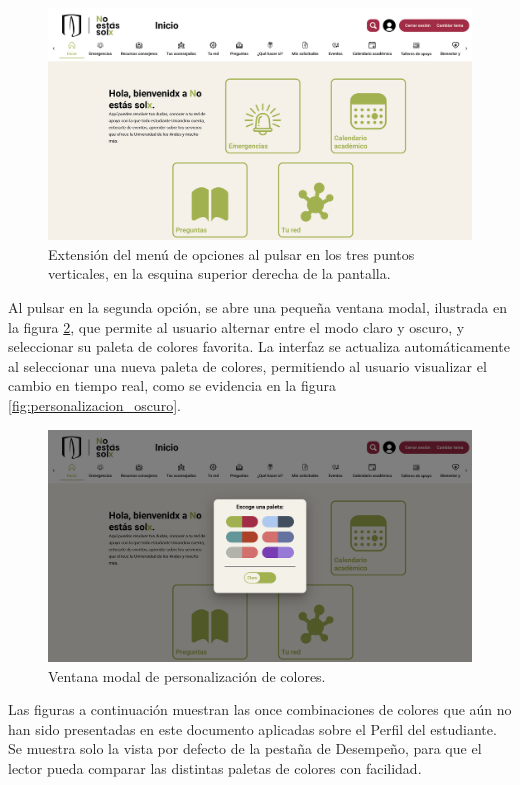 \begin{figure}[H]
	\includegraphics[width=\textwidth]{assets/nes/menu_personalizacion.png}
	\caption{Extensión del menú de opciones al pulsar en los tres puntos verticales, en la esquina superior derecha de la pantalla.}
	\label{fig:menu_personalizacion}
\end{figure}

Al pulsar en la segunda opción, se abre una pequeña ventana modal, ilustrada en la figura \ref{fig:personalizacion}, que permite al usuario alternar entre el modo claro y oscuro, y seleccionar su paleta de colores favorita. La interfaz se actualiza automáticamente al seleccionar una nueva paleta de colores, permitiendo al usuario visualizar el cambio en tiempo real, como se evidencia en la figura \ref{fig:personalizacion_oscuro}.

\begin{figure}[H]
	\includegraphics[width=\textwidth]{assets/nes/personalizacion.png}
	\caption{Ventana modal de personalización de colores.}
	\label{fig:personalizacion}
\end{figure}

Las figuras a continuación muestran las once combinaciones de colores que aún no han sido presentadas en este documento aplicadas sobre el Perfil del estudiante. Se muestra solo la vista por defecto de la pestaña de Desempeño, para que el lector pueda comparar las distintas paletas de colores con facilidad.

